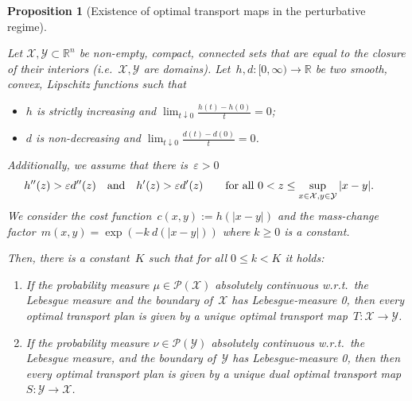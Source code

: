 \documentclass{article}
\newtheorem{proposition}[theorem]{Proposition}
\theoremstyle{definition}
\begin{document}
\begin{proposition}[Existence of optimal transport maps in the perturbative regime]\label{the:existence_optimal_maps}

    Let $\mathcal{X}, \mathcal{Y} \subset \mathbb{R}^n$ be non-empty, compact, connected sets that are equal to the closure of their interiors (i.e.~$\mathcal{X}, \mathcal{Y}$ are domains). Let~$h,d: [0, \infty) \to \mathbb{R}$ be two smooth, convex, Lipschitz functions such that 
    \begin{itemize}
        \item $h$ is strictly increasing and $\lim_{t \downarrow 0} \frac{h(t) - h(0)}{t} =0$;
        \item $d$ is non-decreasing and $\lim_{t \downarrow 0} \frac{d(t) - d(0)}{t} =0$.
    \end{itemize}
    Additionally, we assume that there is~$\varepsilon>0$
    \begin{align}\label{equ:assumptions_d_and_h}
    \hspace{-0.5cm}
             h''(z)  > \varepsilon d''(z) \quad \mbox{and} \quad
    h'(z) > \varepsilon d'(z)  \qquad \mbox{for all } 0< z \leq \sup_{x\in \mathcal{X} , y \in \mathcal{Y}} |x-y|.      
    \end{align}
    We consider the cost function~$c(x,y):= h(|x-y|)$ and the mass-change factor~$m(x,y)= \exp(- k \ d(|x-y|))$ where $k \geq 0$ is a constant. \newline

    Then, there is a constant~$K$ such that for all $0 \leq k < K$ it holds:
    \begin{enumerate}
    \item[(i)] If the probability measure $\mu \in \mathcal{P} (\mathcal{X})$ absolutely continuous w.r.t.~the Lebesgue measure and the boundary of~$\mathcal{X}$ has Lebesgue-measure 0, then every optimal transport plan is given by a unique optimal transport map~$T: \mathcal{X} \to \mathcal{Y}$.
    
    \item[(ii)] If the probability measure $\nu \in \mathcal{P} (\mathcal{Y})$ absolutely continuous w.r.t.~the Lebesgue measure, and the boundary of~$\mathcal{Y}$ has Lebesgue-measure 0, then then every optimal transport plan is given by a unique dual optimal transport map~$S: \mathcal{Y} \to \mathcal{X}$.
    \end{enumerate}

\end{proposition}
\end{document}
